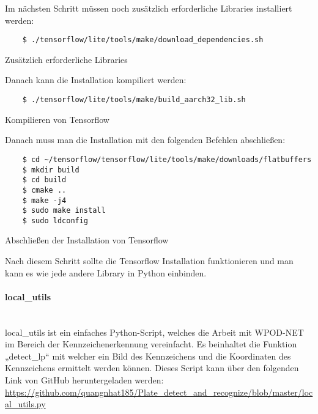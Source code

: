Im nächsten Schritt müssen noch zusätzlich erforderliche Libraries installiert werden:

\begin{listing}[H]
    \begin{verbatim}
    $ ./tensorflow/lite/tools/make/download_dependencies.sh
    \end{verbatim}
    \caption{Zusätzlich erforderliche Libraries}
\end{listing}

Danach kann die Installation kompiliert werden:

\begin{listing}[H]
    \begin{verbatim}
    $ ./tensorflow/lite/tools/make/build_aarch32_lib.sh
    \end{verbatim}
    \caption{Kompilieren von Tensorflow}
\end{listing}

Danach muss man die Installation mit den folgenden Befehlen abschließen:

\begin{listing}[H]
    \begin{verbatim}
    $ cd ~/tensorflow/tensorflow/lite/tools/make/downloads/flatbuffers
    $ mkdir build
    $ cd build
    $ cmake ..
    $ make -j4
    $ sudo make install
    $ sudo ldconfig
    \end{verbatim}
    \caption{Abschließen der Installation von Tensorflow}
\end{listing}

Nach diesem Schritt sollte die Tensorflow Installation funktionieren und man kann es wie jede andere Library in Python einbinden.

\paragraph{local{\_}utils}\mbox{}\\
local{\_}utils ist ein einfaches Python-Script, welches die Arbeit mit WPOD-NET im Bereich der Kennzeichenerkennung vereinfacht. Es beinhaltet die Funktion „detect{\_}lp“ mit 
welcher ein Bild des Kennzeichens und die Koordinaten des Kennzeichens ermittelt werden können. Dieses Script kann über den 
folgenden Link von GitHub heruntergeladen werden: \url{https://github.com/quangnhat185/Plate_detect_and_recognize/blob/master/local_utils.py} 

